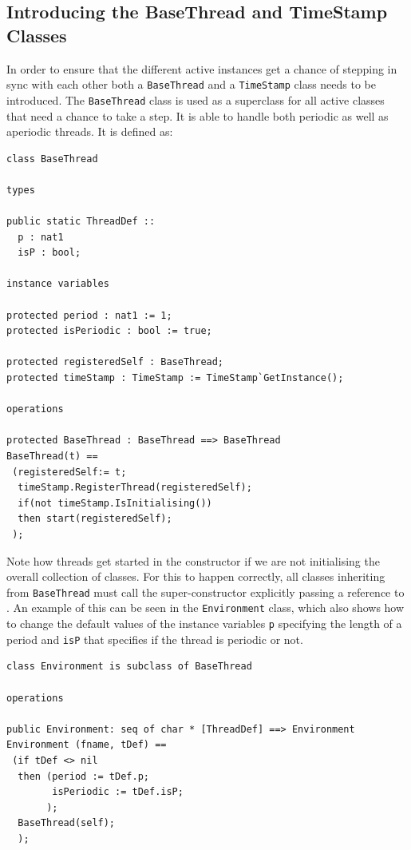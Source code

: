 \documentclass{overturerepchap}
\begin{document}
\subsection{Introducing the BaseThread and TimeStamp Classes}

In order to ensure that the different active instances get a chance of
stepping in sync with each other both a \texttt{BaseThread} and a
\texttt{TimeStamp} class needs to be introduced. The \texttt{BaseThread}
class is used as a superclass for all active classes that need a chance to 
take a step. It is able to handle both periodic as well as aperiodic threads.
It is defined as:

\begin{lstlisting}
class BaseThread
	
types

public static ThreadDef ::
  p : nat1
  isP : bool;

instance variables

protected period : nat1 := 1;
protected isPeriodic : bool := true;

protected registeredSelf : BaseThread;
protected timeStamp : TimeStamp := TimeStamp`GetInstance();

operations

protected BaseThread : BaseThread ==> BaseThread
BaseThread(t) ==
 (registeredSelf:= t;
  timeStamp.RegisterThread(registeredSelf);
  if(not timeStamp.IsInitialising())
  then start(registeredSelf);  
 );
\end{lstlisting}
\noindent Note how threads get started in the constructor if we are not
initialising the overall collection of classes. For this to happen correctly, all classes inheriting from \texttt{BaseThread} must call the super-constructor explicitly passing a reference to {\bf{}}. An example of this can be seen in the \texttt{Environment} class, which also shows how to change the default values of the instance variables \texttt{p} specifying the length of a period and \texttt{isP} that specifies if the thread is periodic or not.

\begin{lstlisting}
class Environment is subclass of BaseThread

operations

public Environment: seq of char * [ThreadDef] ==> Environment
Environment (fname, tDef) ==
 (if tDef <> nil
  then (period := tDef.p;
        isPeriodic := tDef.isP;
       );
  BaseThread(self);
  );
\end{lstlisting}
\end{document}
